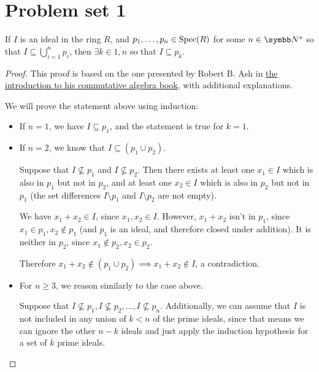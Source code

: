\section*{Problem set 1}

\begin{problem}
If \(I\) is an ideal in the ring \(R\), and \(p_1, \dots, p_n \in \operatorname{Spec}(R)\) for some \(n \in \naturals^*\) so that \(I \subseteq \bigcup_{i = 1}^{n} p_i\), then \(\exists k \in \overline{1, n}\) so that \(I \subseteq p_k\).
\end{problem}
\begin{proof}
This proof is based on the one presented by Robert B. Ash in \href{https://faculty.math.illinois.edu/~r-ash/ComAlg/ComAlg0.pdf}{the introduction to his commutative algebra book}, with additional explanations.

We will prove the statement above using induction:
\begin{itemize}
    \item If \(n = 1\), we have \(I \subseteq p_1\), and the statement is true for \(k = 1\).
    \item If \(n = 2\), we know that \(I \subseteq (p_1 \cup p_2)\).
    
    Suppose that \(I \not\subseteq p_1\) and \(I \not\subseteq p_2\). Then there exists at least one \(x_1 \in I\) which is also in \(p_1\) but not in \(p_2\), and at least one \(x_2 \in I\) which is also in \(p_2\) but not in \(p_1\) (the set differences \(I \setminus p_1\) and \(I \setminus p_2\) are not empty).
    
    We have \(x_1 + x_2 \in I\), since \(x_1, x_2 \in I\). However, \(x_1 + x_2\) isn't in \(p_1\), since \(x_1 \in p_1, x_2 \not\in p_1\) (and \(p_1\) is an ideal, and therefore closed under addition). It is neither in \(p_2\), since \(x_1 \not\in p_2, x_2 \in p_2\).
    
    Therefore \(x_1 + x_2 \not\in (p_1 \cup p_2) \implies x_1 + x_2 \not\in I\), a contradiction.

    \item For \(n \geq 3\), we reason similarly to the case above.
    
    Suppose that \(I \not\subseteq p_1, I \not\subseteq p_2, \dots, I \not\subseteq p_n\). Additionally, we can assume that \(I\) is not included in any union of \(k < n\) of the prime ideals, since that means we can ignore the other \(n - k\) ideals and just apply the induction hypothesis for a set of \(k\) prime ideals.
    

\end{itemize}
\end{proof}
